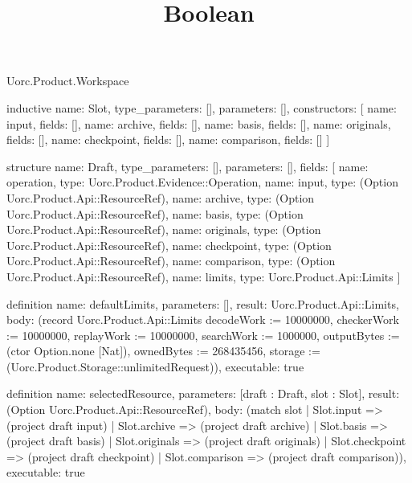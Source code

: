 \begin{lexlean}{Uorc.Product.Workspace}
\title{Boolean}
\begin{semanticmodule}
inductive{
  name: Slot,
  type_parameters: [],
  parameters: [],
  constructors: [
    {name: input, fields: []},
    {name: archive, fields: []},
    {name: basis, fields: []},
    {name: originals, fields: []},
    {name: checkpoint, fields: []},
    {name: comparison, fields: []}
  ]
}

structure{
  name: Draft,
  type_parameters: [],
  parameters: [],
  fields: [
    {name: operation, type: Uorc.Product.Evidence::Operation},
    {name: input, type: (Option Uorc.Product.Api::ResourceRef)},
    {name: archive, type: (Option Uorc.Product.Api::ResourceRef)},
    {name: basis, type: (Option Uorc.Product.Api::ResourceRef)},
    {name: originals, type: (Option Uorc.Product.Api::ResourceRef)},
    {name: checkpoint, type: (Option Uorc.Product.Api::ResourceRef)},
    {name: comparison, type: (Option Uorc.Product.Api::ResourceRef)},
    {name: limits, type: Uorc.Product.Api::Limits}
  ]
}

definition{
  name: defaultLimits,
  parameters: [],
  result: Uorc.Product.Api::Limits,
  body: (record Uorc.Product.Api::Limits {decodeWork := 10000000, checkerWork := 10000000, replayWork := 10000000, searchWork := 1000000, outputBytes := (ctor Option.none [Nat]), ownedBytes := 268435456, storage := (Uorc.Product.Storage::unlimitedRequest)}),
  executable: true
}

definition{
  name: selectedResource,
  parameters: [draft : Draft, slot : Slot],
  result: (Option Uorc.Product.Api::ResourceRef),
  body: (match slot
    | Slot.input => (project draft input)
    | Slot.archive => (project draft archive)
    | Slot.basis => (project draft basis)
    | Slot.originals => (project draft originals)
    | Slot.checkpoint => (project draft checkpoint)
    | Slot.comparison => (project draft comparison)),
  executable: true
}


\end{semanticmodule}
\end{lexlean}

